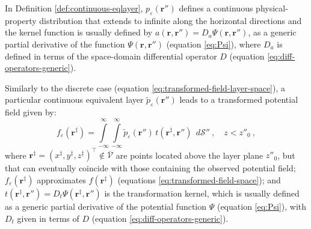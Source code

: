 In Definition \ref{def:continuous-eqlayer}, $p_{\varepsilon}(\mathbf{r}'')$ defines a continuous physical-property distribution 
that extends to infinite along the horizontal directions and the kernel function is usually defined by
$a(\mathbf{r}, \mathbf{r}'') = D_{a} \Psi(\mathbf{r}, \mathbf{r}'')$, as a generic partial derivative of 
the function $\Psi(\mathbf{r}, \mathbf{r}'')$ (equation \ref{eq:Psi}),
where $D_{a}$ is defined in terms of the space-domain differential operator 
$D$ (equation \ref{eq:diff-operators-generic}).

Similarly to the discrete case (equation \ref{eq:transformed-field-layer-space}), a particular continuous equivalent layer 
$\tilde{p}_{\varepsilon}(\mathbf{r}'')$ leads to a transformed potential field given by:
\begin{equation}
	f_{\varepsilon}(\mathbf{r}^{\ddagger})
	= \int\limits_{-\infty}^{\infty}\int\limits_{-\infty}^{\infty}
	\tilde{p}_{\varepsilon}(\mathbf{r}'') \, t(\mathbf{r}^{\ddagger}, \mathbf{r}'') \:\: d\mathcal{S}''
	\: , \quad z < z''_{0} \: ,
	\label{eq:transformed-field-integral-space}
\end{equation}
where $\mathbf{r}^{\ddagger} = (x^{\ddagger}, y^{\ddagger}, z^{\ddagger})^{\top} \notin \overline{\mathcal{V}}$ 
are points located above the layer plane $z''_{0}$, but that can eventually 
coincide with those containing the observed potential field; 
$f_{\varepsilon}(\mathbf{r}^{\ddagger})$ approximates 
$f(\mathbf{r}^{\ddagger})$ (equations \ref{eq:transformed-field-space}); and
$t(\mathbf{r}^{\ddagger}, \mathbf{r}'') = D_{t} \Psi(\mathbf{r}^{\ddagger}, \mathbf{r}'')$ is the transformation kernel,
which is usually defined as a generic partial derivative of the potential function $\Psi$
(equation \ref{eq:Psi}), with $D_{t}$ given in terms of $D$ (equation \ref{eq:diff-operators-generic}).

